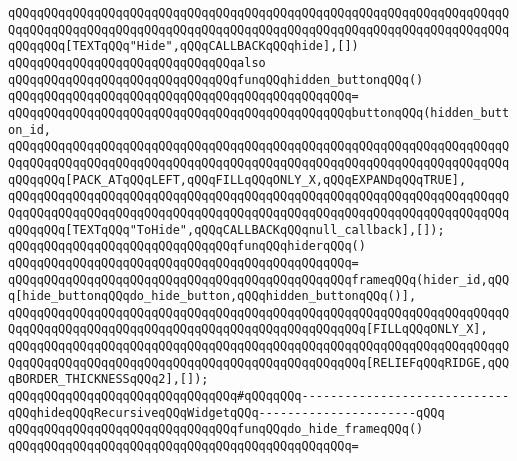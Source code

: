 \verb|qQQqqQQqqQQqqQQqqQQqqQQqqQQqqQQqqQQqqQQqqQQqqQQqqQQqqQQqqQQqqQQqqQQqqQQqqQQqqQQqqQQqqQQqqQQqqQQqqQQqqQQqqQQqqQQqqQQqqQQqqQQqqQQqqQQqqQQqqQQqqQQqqQQq[TEXTqQQq"Hide",qQQqCALLBACKqQQqhide],[])|\newline
\newline
\verb|qQQqqQQqqQQqqQQqqQQqqQQqqQQqqQQqalso|\newline
\verb|qQQqqQQqqQQqqQQqqQQqqQQqqQQqqQQqfunqQQqhidden_buttonqQQq()|\newline
\verb|qQQqqQQqqQQqqQQqqQQqqQQqqQQqqQQqqQQqqQQqqQQqqQQq=|\newline
\verb|qQQqqQQqqQQqqQQqqQQqqQQqqQQqqQQqqQQqqQQqqQQqqQQqbuttonqQQq(hidden_button_id,|\newline
\verb|qQQqqQQqqQQqqQQqqQQqqQQqqQQqqQQqqQQqqQQqqQQqqQQqqQQqqQQqqQQqqQQqqQQqqQQqqQQqqQQqqQQqqQQqqQQqqQQqqQQqqQQqqQQqqQQqqQQqqQQqqQQqqQQqqQQqqQQqqQQqqQQqqQQq[PACK_ATqQQqLEFT,qQQqFILLqQQqONLY_X,qQQqEXPANDqQQqTRUE],|\newline
\verb|qQQqqQQqqQQqqQQqqQQqqQQqqQQqqQQqqQQqqQQqqQQqqQQqqQQqqQQqqQQqqQQqqQQqqQQqqQQqqQQqqQQqqQQqqQQqqQQqqQQqqQQqqQQqqQQqqQQqqQQqqQQqqQQqqQQqqQQqqQQqqQQqqQQq[TEXTqQQq"ToHide",qQQqCALLBACKqQQqnull_callback],[]);|\newline
\newline
\verb|qQQqqQQqqQQqqQQqqQQqqQQqqQQqqQQqfunqQQqhiderqQQq()|\newline
\verb|qQQqqQQqqQQqqQQqqQQqqQQqqQQqqQQqqQQqqQQqqQQqqQQq=|\newline
\verb|qQQqqQQqqQQqqQQqqQQqqQQqqQQqqQQqqQQqqQQqqQQqqQQqframeqQQq(hider_id,qQQq[hide_buttonqQQqdo_hide_button,qQQqhidden_buttonqQQq()],|\newline
\verb|qQQqqQQqqQQqqQQqqQQqqQQqqQQqqQQqqQQqqQQqqQQqqQQqqQQqqQQqqQQqqQQqqQQqqQQqqQQqqQQqqQQqqQQqqQQqqQQqqQQqqQQqqQQqqQQqqQQqqQQq[FILLqQQqONLY_X],|\newline
\verb|qQQqqQQqqQQqqQQqqQQqqQQqqQQqqQQqqQQqqQQqqQQqqQQqqQQqqQQqqQQqqQQqqQQqqQQqqQQqqQQqqQQqqQQqqQQqqQQqqQQqqQQqqQQqqQQqqQQqqQQq[RELIEFqQQqRIDGE,qQQqBORDER_THICKNESSqQQq2],[]);|\newline
\newline
\verb|qQQqqQQqqQQqqQQqqQQqqQQqqQQqqQQq#qQQqqQQq-----------------------------qQQqhideqQQqRecursiveqQQqWidgetqQQq----------------------qQQq|\newline
\newline
\verb|qQQqqQQqqQQqqQQqqQQqqQQqqQQqqQQqfunqQQqdo_hide_frameqQQq()|\newline
\verb|qQQqqQQqqQQqqQQqqQQqqQQqqQQqqQQqqQQqqQQqqQQqqQQq=|\newline
